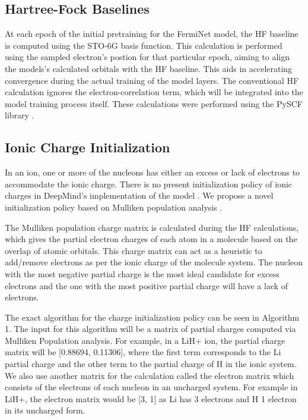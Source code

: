 \documentclass[letterpaper]{article} %
\begin{document}
\subsection{Hartree-Fock Baselines}
At each epoch of the initial pretraining for the FermiNet model, the HF baseline is computed using the STO-6G basis function. This calculation is performed using the sampled electron's postion for that particular epoch, aiming to align the models's calculated orbitals with the HF baseline. This aids in accelerating convergence during the actual training of the model layers. The conventional HF calculation ignores the electron-correlation term, which will be integrated into the model training process itself. These calculations were performed using the PySCF library \cite{pyscf}.

\subsection{Ionic Charge Initialization}
In an ion, one or more of the nucleons has either an excess or lack of electrons to accommodate the ionic charge. There is no present initialization policy of ionic charges in DeepMind's implementation of the model \cite{ferminet_github}. We propose a novel initialization policy based on Mulliken population analysis \cite{Mulliken_1955}.

The Mulliken population charge matrix is calculated during the HF calculations, which gives the partial electron charges of each atom in a molecule based on the overlap of atomic orbitals. This charge matrix can act as a heuristic to add/remove electrons as per the ionic charge of the molecule system. The nucleon with the most negative partial charge is the most ideal candidate for excess electrons and the one with the most positive partial charge will have a lack of electrons.

The exact algorithm for the charge initialization policy can be seen in Algorithm 1. The input for this algorithm will be a matrix of partial charges computed via Mulliken Population analysis. For example, in a LiH+ ion, the partial charge matrix will be [0.88694, 0.11306], where the first term corresponds to the Li partial charge and the other term to the partial charge of H in the ionic system. We also use another matrix for the calculation called the electron matrix which consists of the electrons of each nucleon in an uncharged system. For example in LiH+, the electron matrix would be [3, 1] as Li has 3 electrons and H 1 electron in its uncharged form.
\end{document}
